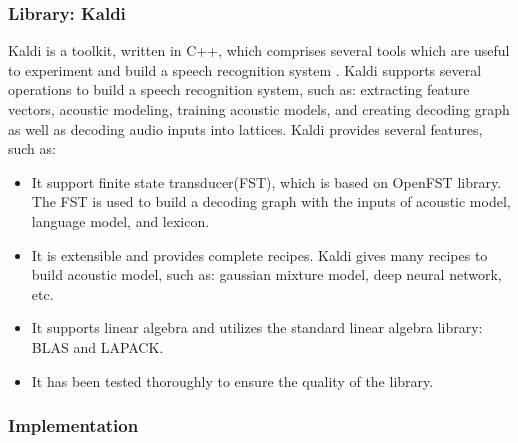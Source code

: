 \subsubsection{Library: Kaldi}
Kaldi is a toolkit, written in C++, which comprises several tools which are useful to experiment and build a speech recognition system \cite{Povey_ASRU2011}. Kaldi supports several operations to build a speech recognition system, such as: extracting feature vectors, acoustic modeling, training acoustic models, and creating decoding graph as well as decoding audio inputs into lattices. Kaldi provides several features, such as:
\begin{itemize}
\item It support finite state transducer(FST), which is based on OpenFST library. The FST is used to build a decoding graph with the inputs of acoustic model, language model, and lexicon.
\item It is extensible and provides complete recipes. Kaldi gives many recipes to build acoustic model, such as: gaussian mixture model, deep neural network, etc.
\item It supports linear algebra and utilizes the standard linear algebra library: BLAS and LAPACK.
\item It has been tested thoroughly to ensure the quality of the library.
\end{itemize}

\subsubsection{Implementation}


